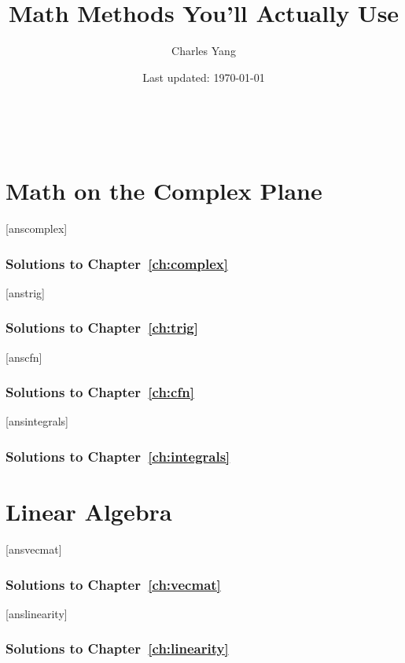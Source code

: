 \documentclass[12pt]{book}
\title{Math Methods You'll Actually Use}
\author{Charles Yang}
\date{Last updated: \today}
\theoremstyle{definition}
\numberwithin{exercise}{section}
\begin{document}

\frontmatter

\setcounter{tocdepth}{1}
\tableofcontents
\mainmatter\

\part{Math on the Complex Plane}
	[anscomplex]
	
	\newpage{}
	\section*{Solutions to Chapter~\ref{ch:complex}}
	

	[anstrig]
	
	\newpage{}
	\section*{Solutions to Chapter~\ref{ch:trig}}
	

	[anscfn]
	
	\newpage{}
	\section*{Solutions to Chapter~\ref{ch:cfn}}
	

	[ansintegrals]
	
	\newpage{}
	\section*{Solutions to Chapter~\ref{ch:integrals}}
	

\part{Linear Algebra}
	[ansvecmat]
	
	\newpage{}
	\section*{Solutions to Chapter~\ref{ch:vecmat}}
	

	[anslinearity]
	
	\newpage{}
	\section*{Solutions to Chapter~\ref{ch:linearity}}
	
\end{document}
